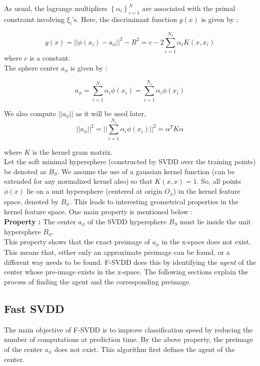 \documentclass{article} %
\begin{document}
As usual, the lagrange multipliers $\left\lbrace \alpha_i \right\rbrace_{i=1}^N$ are associated with the primal constraint involving $\xi_i$'s.
Here, the discriminant function $g(x)$ is given by :

\[ g(x) = ||\phi(x_i) - a_{\phi}||^2 - R^2 = c - 2 \sum\limits_{i=1}^{N_s}\alpha_i K(x,x_i) \]
where $c$ is a constant. \\[10pt]


The sphere center $a_\phi$ is given by :

\[ a_\phi  = \sum\limits_{i=1}^{N} \alpha_i \phi(x_i) = \sum\limits_{i=1}^{N_s} \alpha_i \phi(x_i)\]

We also compute $||a_\phi||$ as it will be used later, 
\begin{equation} \label{norm}
||a_\phi||^2 = ||\sum\limits_{i=1}^{N_s} \alpha_i \phi(x_i) ||^2  = \alpha^T K \alpha
\end{equation}

where $K$ is the kernel gram matrix. \\[10pt]


Let the soft minimal hypersphere (constructed by SVDD over the training points) be denoted as $B_S$. We assume the use of a gaussian kernel function (can  be extended for any normalized kernel also) so that $K(x,x) = 1$. So, all points $\phi(x)$ lie on a unit hypersphere (centered at origin $O_\phi$) in the kernel feature space, denoted by $B_\phi$. This leads to interesting geometrical properties in the kernel feature space. One main property is mentioned below : \\[10pt]

\textbf{Property :} The center $a_\phi$ of the SVDD hypersphere $B_S$ must lie inside the unit hypersphere $B_{\phi}$. \\[10pt]


This property shows that the exact preimage of $a_\phi$ in the x-space does not exist. This means that, either only an approximate preimage can be found, or a different way needs to be found. F-SVDD does this by identifying the \textit{agent} of the center whose pre-image exists in the x-space. The following sections explain the process of finding the agent and the corresponding preimage.


\subsection{Fast SVDD}
The main objective of F-SVDD is to improve classification speed by reducing the number of computations at prediction time. By the above property, the preimage of the center $a_\phi$ does not exist. This algorithm  
first defines the agent of the center.
\end{document}
